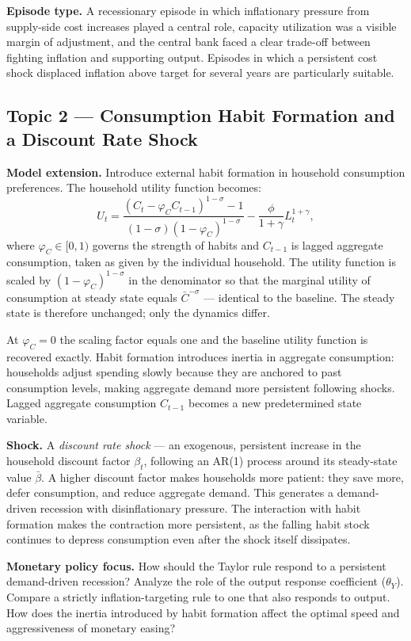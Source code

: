 \documentclass[11pt, a4paper]{article}
\begin{document}
\textbf{Episode type.} A recessionary episode in which inflationary pressure
from supply-side cost increases played a central role, capacity utilization was
a visible margin of adjustment, and the central bank faced a clear trade-off
between fighting inflation and supporting output. Episodes in which a persistent
cost shock displaced inflation above target for several years are particularly
suitable.

\subsection{Topic 2 --- Consumption Habit Formation and a Discount Rate Shock}

\textbf{Model extension.} Introduce external habit formation in household
consumption preferences. The household utility function becomes:
\[
    U_t = \frac{(C_t - \varphi_C C_{t-1})^{1-\sigma}-1}
               {(1-\sigma)(1-\varphi_C)^{1-\sigma}}
          - \frac{\phi}{1+\gamma}L_t^{1+\gamma},
\]
where $\varphi_C \in [0,1)$ governs the strength of habits and $C_{t-1}$ is
lagged aggregate consumption, taken as given by the individual household. The
utility function is scaled by $(1-\varphi_C)^{1-\sigma}$ in the denominator so
that the marginal utility of consumption at steady state equals $\bar{C}^{-\sigma}$
--- identical to the baseline. The steady state is therefore unchanged; only
the dynamics differ.

At $\varphi_C = 0$ the scaling factor equals one and the baseline utility
function is recovered exactly. Habit formation introduces inertia in aggregate
consumption: households adjust spending slowly because they are anchored to
past consumption levels, making aggregate demand more persistent following
shocks. Lagged aggregate consumption $C_{t-1}$ becomes a new predetermined
state variable.

\textbf{Shock.} A \textit{discount rate shock} --- an exogenous, persistent
increase in the household discount factor $\beta_t$, following an AR(1) process
around its steady-state value $\bar{\beta}$. A higher discount factor makes
households more patient: they save more, defer consumption, and reduce aggregate
demand. This generates a demand-driven recession with disinflationary pressure.
The interaction with habit formation makes the contraction more persistent, as
the falling habit stock continues to depress consumption even after the shock
itself dissipates.

\textbf{Monetary policy focus.} How should the Taylor rule respond to a
persistent demand-driven recession? Analyze the role of the output response
coefficient ($\theta_Y$). Compare a strictly inflation-targeting rule to one
that also responds to output. How does the inertia introduced by habit formation
affect the optimal speed and aggressiveness of monetary easing?
\end{document}
